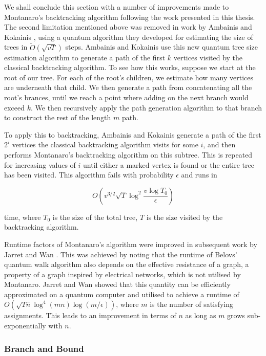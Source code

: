 We shall conclude this section with a number of improvements made to Montanaro's backtracking algorithm following the work presented in this thesis. The second limitation mentioned above was removed in work by Ambainis and Kokainis \cite{ambainis2017}, using a quantum algorithm they developed for estimating the size of trees in $\tilde{O}(\sqrt{vT})$ steps. Ambainis and Kokainis use this new quantum tree size estimation algorithm to generate a path of the first $k$ vertices visited by the classical backtracking algorithm. To see how this works, suppose we start at the root of our tree. For each of the root's children, we estimate how many vertices are underneath that child. We then generate a path from concatenating all the root's brances, until we reach a point where adding on the next branch would exceed $k$. We then recursively apply the path generation algorithm to that branch to construct the rest of the length $m$ path.

To apply this to backtracking, Ambainis and Kokainis generate a path of the first $2^i$ vertices the classical backtracking algorithm visits for some $i$, and then performs Montanaro's backtracking algorithm on this subtree. This is repeated for increasing values of $i$ until either a marked vertex is found or the entire tree has been visited. This algorithm fails with probability $\epsilon$ and runs in

$$O\left(v^{3/2}\sqrt{T}\log^2\frac{v\log T_0}{\epsilon}\right)$$

\noindent time, where $T_0$ is the size of the total tree, $T$ is the size visited by the backtracking algorithm.

Runtime factors of Montanaro's algorithm were improved in subsequent work by Jarret and Wan \cite{jarret2018}. This was achieved by noting that the runtime of Belovs' quantum walk algorithm also depends on the effective resistance of a graph, a property of a graph inspired by electrical networks, which is not utilised by Montanaro. Jarret and Wan showed that this quantity can be efficiently approximated on a quantum computer and utilised to achieve a runtime of $O(\sqrt{Tn}\log^4(mn)\log(m/\epsilon))$, where $m$ is the number of satisfying assignments. This leads to an improvement in terms of $n$ as long as $m$ grows sub-exponentially with $n$.

\subsubsection{Branch and Bound}

